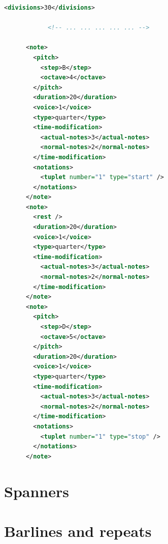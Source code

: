 \documentclass[12pt,a4paper]{article}
\begin{document}
\begin{lstlisting}[language=XML, caption=Tuplet example]
        <divisions>30</divisions>

			<!-- ... ... ... ... ... -->
			
      <note>
        <pitch>
          <step>B</step>
          <octave>4</octave>
        </pitch>
        <duration>20</duration>
        <voice>1</voice>
        <type>quarter</type>
        <time-modification>
          <actual-notes>3</actual-notes>
          <normal-notes>2</normal-notes>
        </time-modification>
        <notations>
          <tuplet number="1" type="start" />
        </notations>
      </note>
      <note>
        <rest />
        <duration>20</duration>
        <voice>1</voice>
        <type>quarter</type>
        <time-modification>
          <actual-notes>3</actual-notes>
          <normal-notes>2</normal-notes>
        </time-modification>
      </note>
      <note>
        <pitch>
          <step>D</step>
          <octave>5</octave>
        </pitch>
        <duration>20</duration>
        <voice>1</voice>
        <type>quarter</type>
        <time-modification>
          <actual-notes>3</actual-notes>
          <normal-notes>2</normal-notes>
        </time-modification>
        <notations>
          <tuplet number="1" type="stop" />
        </notations>
      </note>
\end{lstlisting}

\section{Spanners}

\section{Barlines and repeats}

\end{document}

